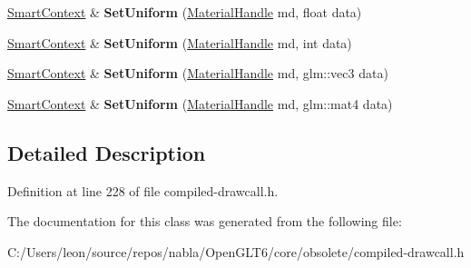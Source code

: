 \begin{DoxyCompactItemize}
\item 
\mbox{\label{classnabla_1_1renderer_1_1_smart_context_a1fce967c551e73f5638de4c669f4dae1}} 
\mbox{\hyperlink{classnabla_1_1renderer_1_1_smart_context}{Smart\+Context}} \& {\bfseries Set\+Uniform} (\mbox{\hyperlink{classnabla_1_1renderer_1_1_handle}{Material\+Handle}} md, float data)
\item 
\mbox{\label{classnabla_1_1renderer_1_1_smart_context_aa57bf16497e7926bf8be27b4f51b468f}} 
\mbox{\hyperlink{classnabla_1_1renderer_1_1_smart_context}{Smart\+Context}} \& {\bfseries Set\+Uniform} (\mbox{\hyperlink{classnabla_1_1renderer_1_1_handle}{Material\+Handle}} md, int data)
\item 
\mbox{\label{classnabla_1_1renderer_1_1_smart_context_a8e028a4e69953aca1b982e0e2e81b0d0}} 
\mbox{\hyperlink{classnabla_1_1renderer_1_1_smart_context}{Smart\+Context}} \& {\bfseries Set\+Uniform} (\mbox{\hyperlink{classnabla_1_1renderer_1_1_handle}{Material\+Handle}} md, glm\+::vec3 data)
\item 
\mbox{\label{classnabla_1_1renderer_1_1_smart_context_aeb5923b5ec64ce390c559495c35baa63}} 
\mbox{\hyperlink{classnabla_1_1renderer_1_1_smart_context}{Smart\+Context}} \& {\bfseries Set\+Uniform} (\mbox{\hyperlink{classnabla_1_1renderer_1_1_handle}{Material\+Handle}} md, glm\+::mat4 data)
\end{DoxyCompactItemize}


\subsection{Detailed Description}


Definition at line 228 of file compiled-\/drawcall.\+h.



The documentation for this class was generated from the following file\+:\begin{DoxyCompactItemize}
\item 
C\+:/\+Users/leon/source/repos/nabla/\+Open\+G\+L\+T6/core/obsolete/compiled-\/drawcall.\+h\end{DoxyCompactItemize}
